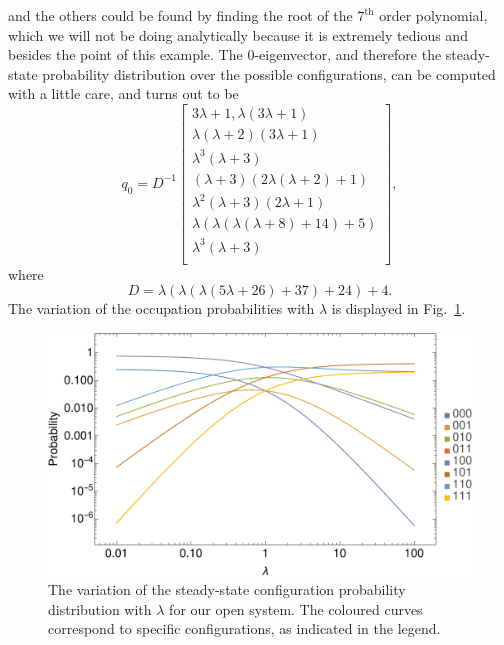 and the others could be found by finding the root of the $7^\mathrm{th}$ order polynomial, which we
will not be doing analytically because it is extremely tedious and besides the point of this
example. The
$0$-eigenvector, and therefore the steady-state probability distribution over the possible
configurations, can be computed with a little care, and turns out to be
\begin{equation}
 q_0 = D^{-1}
 \begin{bmatrix}
  3 \lambda +1,\lambda  (3 \lambda +1) \\
  \lambda  (\lambda +2) (3 \lambda +1) \\
  \lambda ^3 (\lambda +3) \\
  (\lambda +3) (2 \lambda  (\lambda +2)+1) \\
  \lambda ^2 (\lambda +3) (2 \lambda +1) \\
  \lambda  (\lambda  (\lambda (\lambda +8)+14)+5) \\
  \lambda ^3 (\lambda +3) \\
 \end{bmatrix},
\end{equation}
where
\begin{equation}
 D = \lambda  (\lambda  (\lambda  (5 \lambda +26)+37)+24)+4.
\end{equation}
The variation of the occupation probabilities with $\lambda$ is displayed in
Fig.~\ref{fig:smallOccProbs}.
 \begin{figure}[h!]
 \caption[The variation of configuration probabilities with $\lambda$ for a small open system.]{\label{fig:smallOccProbs} 
 The variation of the steady-state configuration probability distribution with $\lambda$ for our
 open system. The coloured curves correspond to specific configurations, as indicated in the legend.
 }
  \begin{center}
 \includegraphics[width=1.0\textwidth]{TRM/images/smallOpenOcc}
  \end{center}
\end{figure}
